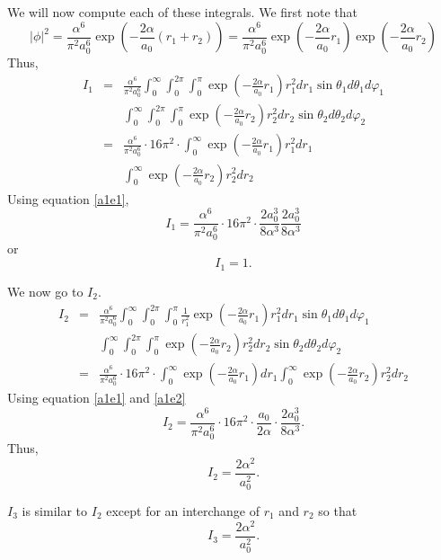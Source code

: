 \documentclass{article}
\numberwithin{equation}{section}
\begin{document}
We will now compute each of these integrals. We first note that
\[
|\phi|^2 = 
\frac{\alpha^6}{\pi^2 a_0^6}\exp\left(-\frac{2\alpha}{a_0}(r_1+r_2)\right)
= \frac{\alpha^6}{\pi^2 a_0^6}\exp\left(-\frac{2\alpha}{a_0}r_1\right)
\exp\left(-\frac{2\alpha}{a_0}r_2\right)  
\]
Thus,
\begin{eqnarray*}
I_1 &=& \frac{\alpha^6}{\pi^2 a_0^6}
\int_0^\infty\int_0^{2\pi}\int_0^\pi\exp\left(-\frac{2\alpha}{a_0}r_1
	\right) r_1^2dr_1\sin\theta_1d\theta_1d\varphi_1 \\
 & & 
\int_0^\infty\int_0^{2\pi}\int_0^\pi\exp\left(-\frac{2\alpha}{a_0}r_2
	\right) r_2^2dr_2\sin\theta_2d\theta_2d\varphi_2 \\
 &=& \frac{\alpha^6}{\pi^2 a_0^6}\cdot 16\pi^2 \cdot
 \int_0^\infty\exp\left(-\frac{2\alpha}{a_0}r_1\right)r_1^2dr_1 \\
 & & \int_0^\infty\exp\left(-\frac{2\alpha}{a_0}r_2\right)r_2^2dr_2 
\end{eqnarray*}
Using equation \eqref{a1e1},
\[
I_1 = \frac{\alpha^6}{\pi^2 a_0^6}\cdot 16\pi^2 \cdot
 \frac{2a_0^3}{8\alpha^3}\frac{2a_0^3}{8\alpha^3}
\]
or
\begin{equation}\label{s5e73}
I_1 = 1.
\end{equation}

We now go to $I_2$.
\begin{eqnarray*}
I_2 &=& \frac{\alpha^6}{\pi^2 a_0^6}
\int_0^\infty\int_0^{2\pi}\int_0^\pi
\frac{1}{r_1^2}\exp\left(-\frac{2\alpha}{a_0}r_1\right)
r_1^2dr_1\sin\theta_1d\theta_1d\varphi_1 \\
 & & 
\int_0^\infty\int_0^{2\pi}\int_0^\pi\exp\left(-\frac{2\alpha}{a_0}r_2
	\right) r_2^2dr_2\sin\theta_2d\theta_2d\varphi_2 \\
 &=& \frac{\alpha^6}{\pi^2 a_0^6}\cdot 16\pi^2 \cdot
 \int_0^\infty\exp\left(-\frac{2\alpha}{a_0}r_1\right)dr_1 
 \int_0^\infty\exp\left(-\frac{2\alpha}{a_0}r_2\right)r_2^2dr_2 
\end{eqnarray*}
Using equation \eqref{a1e1} and \eqref{a1e2}
\[
I_2 = \frac{\alpha^6}{\pi^2 a_0^6}\cdot 16\pi^2 \cdot \frac{a_0}{2\alpha}
\cdot \frac{2a_0^3}{8\alpha^3}.
\]
Thus,
\begin{equation}\label{s5e74}
I_2 = \frac{2\alpha^2}{a_0^2}.
\end{equation}

$I_3$ is similar to $I_2$ except for an interchange of $r_1$ and $r_2$ so
that
\begin{equation}\label{s5e75}
I_3 = \frac{2\alpha^2}{a_0^2}.
\end{equation}
\end{document}
